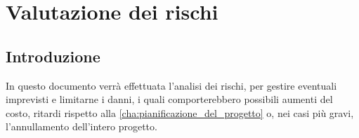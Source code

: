 \chapter{Valutazione dei rischi} 

\section{Introduzione}
In questo documento verrà effettuata l'analisi dei rischi, per gestire eventuali imprevisti e limitarne i danni, i quali comporterebbero possibili aumenti del costo, ritardi rispetto alla \ref{cha:pianificazione_del_progetto} o, nei casi più gravi, l'annullamento dell'intero progetto.